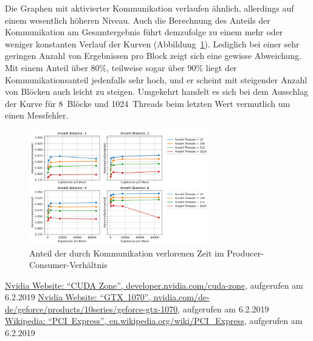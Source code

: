 \documentclass[11pt, abstract=on]{scrartcl}
\begin{document}
Die Graphen mit aktivierter Kommunikation verlaufen ähnlich, allerdings auf einem wesentlich höheren Niveau. Auch die Berechnung des Anteils der Kommunikation am Gesamtergebnis führt demzufolge zu einem mehr oder weniger konstanten Verlauf der Kurven (Abbildung~\ref{fig:KommunikationAnteil}). Lediglich bei einer sehr geringen Anzahl von Ergebnissen pro Block zeigt sich eine gewisse Abweichung. Mit einem Anteil über 80\%, teilweise sogar über 90\% liegt der Kommunikationsanteil jedenfalls sehr hoch, und er scheint mit steigender Anzahl von Blöcken auch leicht zu steigen. Umgekehrt handelt es sich bei dem Ausschlag der Kurve für 8~Blöcke und 1024~Threads beim letzten Wert vermutlich um einen Messfehler.
\begin{figure} [htbp]
 	\centering
 		\includegraphics[width=0.7\textwidth]{Graph_KommunikationAnteil.png}
 	\caption{Anteil der durch Kommunikation verlorenen Zeit im Producer-Consumer-Verhältnis}
 	\label{fig:KommunikationAnteil}
\end{figure}

\pagebreak
\begin{thebibliography}{99}
	  \href{https://developer.nvidia.com/cuda-zone}{Nvidia Website: ``CUDA Zone'', developer.nvidia.com/cuda-zone}, aufgerufen am 6.2.2019
	  \href{https://www.nvidia.com/de-de/geforce/products/10series/geforce-gtx-1070/}{Nvidia Website: ``GTX~1070'', nvidia.com/de-de/geforce/products/10series/geforce-gtx-1070}, aufgerufen am 6.2.2019
	  \href{https://en.wikipedia.org/wiki/PCI_Express}{Wikipedia: ``PCI~Express'', en.wikipedia.org/wiki/PCI\_Express}, aufgerufen am 6.2.2019
\end{thebibliography}
\end{document}
